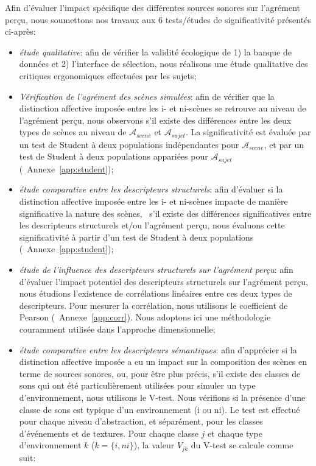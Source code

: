 Afin d'évaluer l'impact spécifique des différentes sources sonores sur l'agrément perçu, nous soumettons nos travaux aux 6 tests/études de significativité présentés ci-après:

\begin{itemize}
\item \emph{étude qualitative}: afin de vérifier la validité écologique de 1) la banque de données et 2) l'interface de sélection, nous réalisons une étude qualitative des critiques ergonomiques effectuées par les sujets;
\item \emph{Vérification de l'agrément des scènes simulées}: afin de vérifier que la distinction affective imposée entre les i- et ni-scènes se retrouve au niveau de l'agrément perçu, nous observons s'il existe des différences entre les deux types de scènes au niveau de $\mathcal{A}_{scene}$ et $\mathcal{A}_{sujet}$. La significativité est évaluée par un test de Student à deux populations indépendantes pour $\mathcal{A}_{scene}$, et par un test de Student à deux populations appariées pour $\mathcal{A}_{sujet}$ (\cf~Annexe~\ref{app:student});
\item \emph{étude comparative entre les descripteurs structurels}: afin d'évaluer si la distinction affective imposée entre les i- et ni-scènes impacte de manière significative la nature des scènes, \ie~s'il existe des différences significatives entre les descripteurs structurels et/ou l'agrément perçu, nous évaluons cette significativité à partir d'un test de Student à deux populations (\cf~Annexe~\ref{app:student});
\item \emph{étude de l'influence des descripteurs structurels sur l'agrément perçu}: afin d'évaluer l'impact potentiel des descripteurs structurels sur l'agrément perçu, nous étudions l'existence de corrélations linéaires entre ces deux types de descripteurs. Pour mesurer la corrélation, nous utilisons le coefficient de Pearson (\cf~Annexe~\ref{app:corr}). Nous adoptons ici une méthodologie couramment utilisée dans l'approche dimensionnelle;
\item \emph{étude comparative entre les descripteurs sémantiques}: afin d'apprécier si la distinction affective imposée a eu un impact sur la composition des scènes en terme de sources sonores, ou, pour être plus précis, s'il existe des classes de sons qui ont été particulièrement utilisées pour simuler un type d'environnement, nous utilisons le V-test. Nous vérifions si la présence d'une classe de sons est typique d'un environnement (i ou ni). Le test est effectué pour chaque niveau d'abstraction, et séparément, pour les classes d'événements et de textures. Pour chaque classe $j$ et chaque type d'environnement $k$ ($k=\lbrace i,ni\rbrace$), la valeur $V_{jk}$ du V-test se calcule comme suit: 


\end{itemize}
